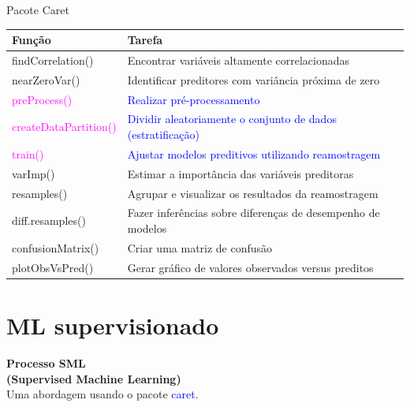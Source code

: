 \documentclass[12pt,ignorenonframetext,aspectratio=1610]{beamer}
\begin{document}

\transwipe
\begin{frame}[t]{Pacote Caret}
	\centering
		\begin{tabular}{@{}ll@{}}
			\toprule
			\textbf{Função}                     & \textbf{Tarefa}  \\ \midrule
			findCorrelation()      & Encontrar variáveis altamente correlacionadas \\
			nearZeroVar()          & Identificar preditores com variância próxima de zero \\
			\textcolor{magenta}{preProcess()}           & \textcolor{blue}{Realizar pré-processamento} \\
			\textcolor{magenta}{createDataPartition()}  & \textcolor{blue}{Dividir aleatoriamente o conjunto de dados (estratificação)} \\
			\textcolor{magenta}{train()}                & \textcolor{blue}{Ajustar modelos preditivos utilizando reamostragem} \\ 
			varImp()               & Estimar a importância das variáveis preditoras \\
			resamples()            & Agrupar e visualizar os resultados da reamostragem \\
			diff.resamples()       & Fazer inferências sobre diferenças de desempenho de modelos \\
			confusionMatrix()     & Criar uma matriz de confusão \\
			plotObsVsPred()       & Gerar gráfico de valores observados versus preditos \\ \bottomrule
		\end{tabular}
\end{frame}

\section{ML supervisionado}

\begin{frame}[c]{}
	
	\begin{center}
	{\Huge \textbf{Processo SML}} \\[.8em] {\Large \textbf{(Supervised Machine Learning)}} \\[2em]
	
	{\Large Uma abordagem usando o pacote \textcolor{blue}{caret}.} \\[.5em]
	
	\cite{kuhn2013applied, R-caret}
	\end{center}
	
\end{frame}
\end{document}
